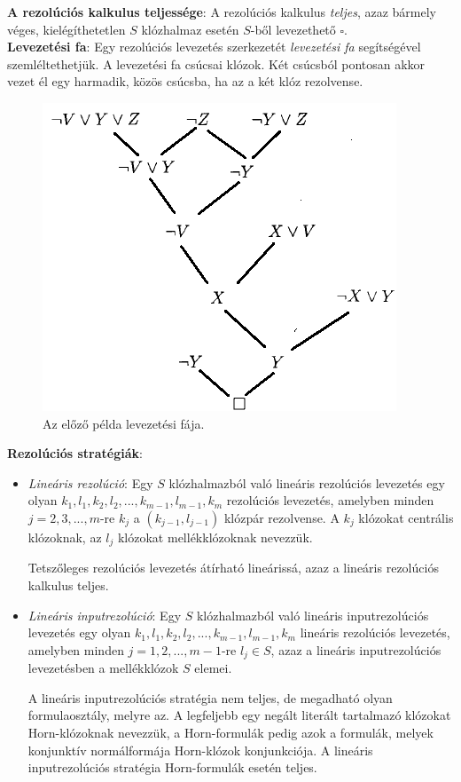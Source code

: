\documentclass[margin=0px]{article}
\begin{document}
\noindent \textbf{A rezolúciós kalkulus teljessége}: A rezolúciós kalkulus \textit{teljes}, azaz bármely véges, kielégíthetetlen
$S$ klózhalmaz esetén $S$-ből levezethető $\square$.\\

\noindent \textbf{Levezetési fa}: Egy rezolúciós levezetés szerkezetét \textit{levezetési fa} segítségével szemléltethetjük.
A levezetési fa csúcsai klózok. Két csúcsból pontosan akkor vezet él egy harmadik, közös csúcsba, ha az a két klóz rezolvense.

\begin{figure}[H]
    \centering
    \includegraphics[width=0.5\linewidth]{img/rezoluciopelda_levfa}
    \caption{Az előző példa levezetési fája.}
    \label{fig:rezoluciopelda_levfa}
\end{figure}

\noindent \textbf{Rezolúciós stratégiák}:

\begin{itemize}
    \item	\textit{Lineáris rezolúció}: Egy $S$ klózhalmazból való lineáris rezolúciós levezetés egy olyan
          $k_{1},l_{1},k_{2},l_{2}, ..., k_{m-1},l_{m-1}, k_{m}$ rezolúciós levezetés, amelyben minden
          $j = 2, 3, ..., m$-re $k_{j}$ a $(k_{j-1},l_{j-1})$ klózpár rezolvense. A $k_{j}$ klózokat centrális
          klózoknak, az $l_{j}$ klózokat mellékklózoknak nevezzük.

          Tetszőleges rezolúciós levezetés átírható lineárissá, azaz a lineáris rezolúciós kalkulus teljes.

    \item	\textit{Lineáris inputrezolúció}: Egy $S$ klózhalmazból való lineáris inputrezolúciós levezetés
          egy olyan $k_{1},l_{1},k_{2},l_{2}, ..., k_{m-1},l_{m-1}, k_{m}$ lineáris rezolúciós levezetés, amelyben minden
          $j = 1, 2, ..., m-1$-re $l_{j} \in S$, azaz a lineáris inputrezolúciós levezetésben a mellékklózok $S$ elemei.

          A lineáris inputrezolúciós stratégia nem teljes, de megadható olyan formulaosztály, melyre az. A legfeljebb egy
          negált literált tartalmazó klózokat Horn-klózoknak nevezzük, a Horn-formulák pedig azok a formulák, melyek
          konjunktív normálformája Horn-klózok konjunkciója. A lineáris inputrezolúciós stratégia Horn-formulák esetén teljes.
\end{itemize}
\end{document}
